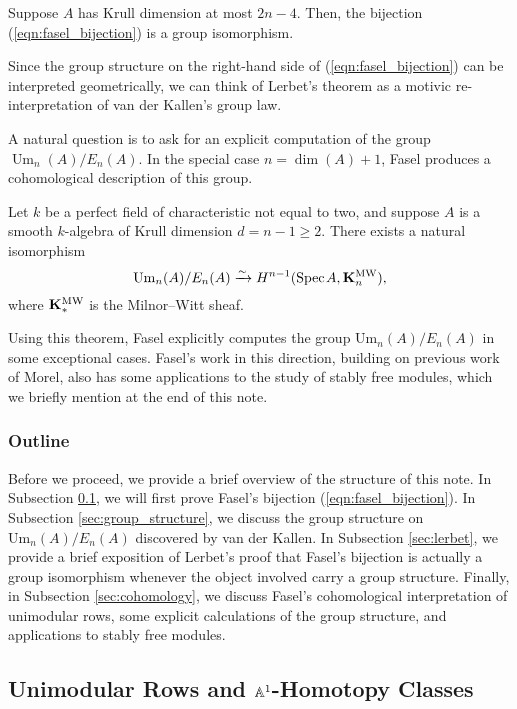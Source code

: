 \begin{theorem}[Lerbet, 2024]
    Suppose $A$ has Krull dimension at most $2n-4$. Then, the bijection (\ref{eqn:fasel_bijection}) is a group isomorphism.
\end{theorem}

Since the group structure on the right-hand side of (\ref{eqn:fasel_bijection}) can be interpreted geometrically, we can think of Lerbet's theorem as a motivic re-interpretation of van der Kallen's group law. 

A natural question is to ask for an explicit computation of the group $\operatorname{Um}_n(A)/E_n(A)$. In the special case $n = \dim(A) + 1$, Fasel \cite{Fasel-unim} produces a cohomological description of this group.

\begin{theorem}[Fasel, 2010]\label{thm:fasel_cohomology}
    Let $k$ be a perfect field of characteristic not equal to two, and suppose $A$ is a smooth $k$-algebra of Krull dimension $d = n-1 \geq 2$. There exists a natural isomorphism 
    \[
    \mathrm{Um}_n(A)/E_n(A) \xrightarrow{\sim} H^{n-1}(\text{Spec}\hspace{0.1em} A,\mathbf{K}^\mathrm{MW}_n),
    \]
    where $\mathbf{K}^\mathrm{MW}_\ast$ is the Milnor--Witt sheaf.
\end{theorem}

Using this theorem, Fasel explicitly computes the group $\mathrm{Um}_n(A)/E_n(A)$ in some exceptional cases. Fasel's work in this direction, building on previous work of Morel, also has some applications to the study of stably free modules, which we briefly mention at the end of this note.

\subsubsection{Outline} Before we proceed, we provide a brief overview of the structure of this note. In Subsection \ref{sec:fasel}, we will first prove Fasel's bijection (\ref{eqn:fasel_bijection}). In Subsection \ref{sec:group_structure}, we discuss the group structure on $\mathrm{Um}_n(A)/E_n(A)$ discovered by van der Kallen. In Subsection \ref{sec:lerbet}, we provide a brief exposition of Lerbet's proof that Fasel's bijection is actually a group isomorphism whenever the object involved carry a group structure. Finally, in Subsection \ref{sec:cohomology}, we discuss Fasel's cohomological interpretation of unimodular rows, some explicit calculations of the group structure, and applications to stably free modules.  

\subsection{Unimodular Rows and \texorpdfstring{$\mathbb{A}^1$}{A1}-Homotopy Classes}\label{sec:fasel}

